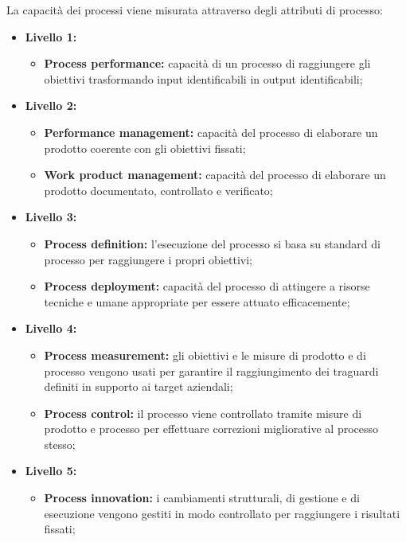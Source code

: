 La capacità dei processi viene misurata attraverso degli attributi di processo:
\begin{itemize}
    \item \textbf{Livello 1:}
        \begin{itemize}
            \item \textbf{Process performance:} capacità di un processo di raggiungere gli obiettivi trasformando input identificabili in output identificabili;
        \end{itemize}
    \item \textbf{Livello 2:}
        \begin{itemize}
            \item \textbf{Performance management:} capacità del processo di elaborare un prodotto coerente con gli obiettivi fissati;
            \item \textbf{Work product management:} capacità del processo di elaborare un prodotto documentato, controllato e verificato;
        \end{itemize}
    \item \textbf{Livello 3:}
        \begin{itemize}
            \item \textbf{Process definition:} l'esecuzione del processo si basa su standard di
            processo per raggiungere i propri obiettivi;
            \item \textbf{Process deployment:} capacità del processo di attingere a risorse tecniche e umane appropriate per essere attuato efficacemente;
        \end{itemize}
    \item \textbf{Livello 4:}
        \begin{itemize}
            \item\textbf{Process measurement:} gli obiettivi e le misure di prodotto e di processo vengono usati per garantire il raggiungimento dei traguardi definiti in supporto ai target aziendali;
           \item \textbf{Process control:} il processo viene controllato tramite misure di prodotto e processo per effettuare correzioni migliorative al processo stesso;
        \end{itemize}
    \item \textbf{Livello 5:}
        \begin{itemize}
            \item \textbf{Process innovation:} i cambiamenti strutturali, di gestione e di esecuzione vengono gestiti in modo controllato per raggiungere i risultati fissati;

\end{itemize}
\end{itemize}
